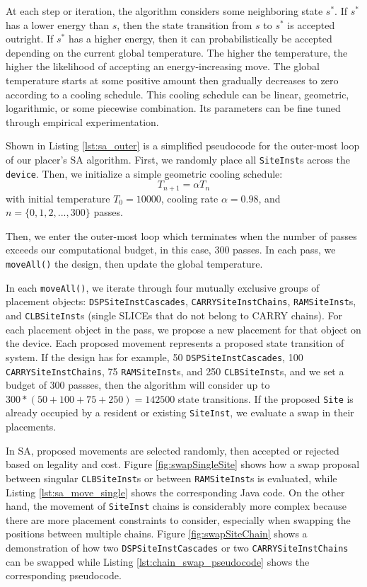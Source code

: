 At each step or iteration, the algorithm considers some neighboring state \(s^*\). 
If \(s^*\) has a lower energy than \(s\), then the state transition from \(s\) to \(s^*\) is accepted outright.
If \(s^*\) has a higher energy, then it can probabilistically be accepted depending on the current global temperature.
The higher the temperature, the higher the likelihood of accepting an energy-increasing move. 
The global temperature starts at some positive amount then gradually decreases to zero according to a cooling schedule.
This cooling schedule can be linear, geometric, logarithmic, or some piecewise combination. 
Its parameters can be fine tuned through empirical experimentation. 

Shown in Listing \ref{lst:sa_outer} is a simplified pseudocode for the outer-most loop of our placer's SA algorithm. 
First, we randomly place all \texttt{SiteInst}s across the \texttt{device}.
Then, we initialize a simple geometric cooling schedule: 
\begin{equation}
    \label{coolingSchedule}
    T_{n+1} = \alpha T_n
\end{equation}
with initial temperature \(T_0=10000\), cooling rate \(\alpha=0.98\), and \(n = \{0, 1, 2, ..., 300\}\) passes.


Then, we enter the outer-most loop which terminates when the number of passes exceeds our computational budget, in this case, 300 passes. 
In each pass, we \texttt{moveAll()} the design, then update the global temperature. 

In each \texttt{moveAll()}, we iterate through four mutually exclusive groups of placement objects: \texttt{DSPSiteInstCascades}, \texttt{CARRYSiteInstChains}, \texttt{RAMSiteInst}s, and \texttt{CLBSiteInst}s (single SLICEs that do not belong to CARRY chains).
For each placement object in the pass, we propose a new placement for that object on the device. 
Each proposed movement represents a proposed state transition of system. 
If the design has for example, 50 \texttt{DSPSiteInstCascades}, 100 \texttt{CARRYSiteInstChains}, 75 \texttt{RAMSiteInst}s, and 250 \texttt{CLBSiteInst}s, and we set a budget of 300 passses, then the algorithm will consider up to \(300 * (50 + 100 + 75 + 250) = 142500\) state transitions. 
If the proposed \texttt{Site} is already occupied by a resident or existing \texttt{SiteInst}, we evaluate a swap in their placements. 

In SA, proposed movements are selected randomly, then accepted or rejected based on legality and cost. 
Figure \ref{fig:swapSingleSite} shows how a swap proposal between singular \texttt{CLBSiteInst}s or between \texttt{RAMSiteInst}s is evaluated, while Listing \ref{lst:sa_move_single} shows the corresponding Java code.
On the other hand, the movement of \texttt{SiteInst} chains is considerably more complex because there are more placement constraints to consider, especially when swapping the positions between multiple chains.
Figure \ref{fig:swapSiteChain} shows a demonstration of how two \texttt{DSPSiteInstCascades} or two \texttt{CARRYSiteInstChains} can be swapped while Listing \ref{lst:chain_swap_pseudocode} shows the corresponding pseudocode. 

